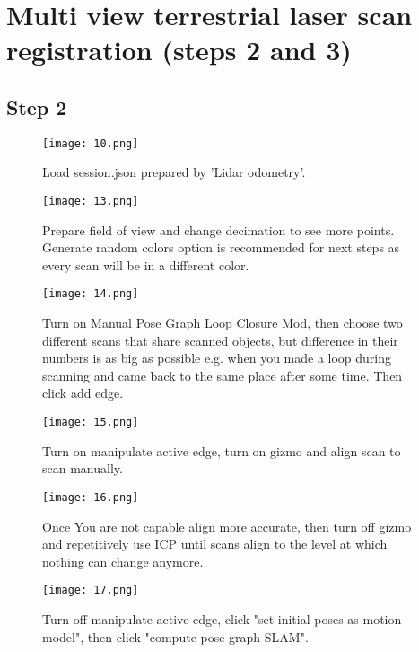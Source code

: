\chapter{Multi view terrestrial laser scan registration (steps 2 and 3)}
\section{Step 2}
\begin{figure}[H]
	\centering
	\texttt{[image: 10.png]}
	\caption{Load session.json prepared by 'Lidar odometry'.}
	\label{fig:10}
\end{figure}

\begin{figure}[H]
	\centering
	\texttt{[image: 13.png]}
	\caption{Prepare field of view and change decimation to see more points. Generate random colors option is recommended for next steps as every scan will be in a different color.}
	\label{fig:13}
\end{figure}

\begin{figure}[H]
	\centering
	\texttt{[image: 14.png]}
	\caption{Turn on Manual Pose Graph Loop Closure Mod, then choose two different scans that share scanned objects, but difference in their numbers is as big as possible e.g. when you made a loop during scanning and came back to the same place after some time. Then click add edge.} 
	\label{fig:14}
\end{figure}

\begin{figure}[H]
	\centering
	\texttt{[image: 15.png]}
	\caption{Turn on manipulate active edge, turn on gizmo and align scan to scan manually.}
	\label{fig:15}
\end{figure}

\begin{figure}[H]
	\centering
	\texttt{[image: 16.png]}
	\caption{Once You are not capable align more accurate, then turn off gizmo and repetitively use ICP until scans align to the level at which nothing can change anymore.}
	\label{fig:16}
\end{figure}

\begin{figure}[H]
	\centering
	\texttt{[image: 17.png]}
	\caption{Turn off manipulate active edge, click "set initial poses as motion model", then click "compute pose graph SLAM".}
	\label{fig:17}
\end{figure}

